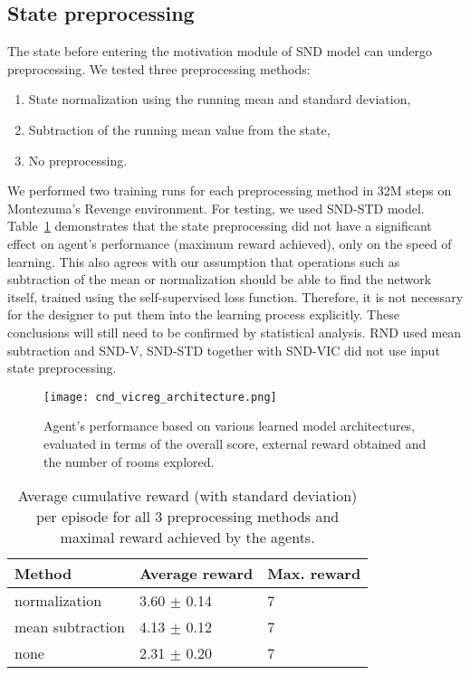 \documentclass[a4paper,11pt]{elsarticle}
\begin{document}
\subsection{State preprocessing}
\label{sec:exp2}

The state before entering the motivation module of SND model can undergo preprocessing. We tested three preprocessing methods:
\begin{enumerate}
\item State normalization using the running mean and standard deviation, 
\item Subtraction of the running mean value from the state, 
\item No preprocessing.
\end{enumerate}

We performed two training runs for each preprocessing method in 32M steps on Montezuma's Revenge environment. For testing, we used SND-STD model. Table~\ref{tab:res1} demonstrates that the state preprocessing did not have a significant effect on agent's performance (maximum reward achieved), only on the speed of learning. This also agrees with our assumption that operations such as subtraction of the mean or normalization should be able to find the network itself, trained using the self-supervised loss function. Therefore, it is not necessary for the designer to put them into the learning process explicitly. These conclusions will still need to be confirmed by statistical analysis. RND used mean subtraction and SND-V, SND-STD together with SND-VIC did not use input state preprocessing.

\begin{figure*}[t!]
\centering
\texttt{[image: cnd\_vicreg\_architecture.png]}
\caption{Agent's performance based on various learned model architectures, evaluated in terms of the overall score, external reward obtained and the number of rooms explored.}
\label{img:result_cnd_learned_arch}
\end{figure*}

\begin{table}[thb]
\scriptsize
\centering
\caption{Average cumulative reward (with standard deviation) per episode for all 3 preprocessing methods and maximal reward achieved by the agents.}
\begin{tabular}{l|ll}
Method & Average reward & Max. reward \\
\hline\hline
normalization    & 3.60 $\pm$ 0.14 & 7 \\ 
mean subtraction & 4.13 $\pm$ 0.12 & 7 \\
none & 2.31 $\pm$ 0.20 & 7 \\
\hline
\end{tabular}
\label{tab:res1}
\end{table}
\end{document}
